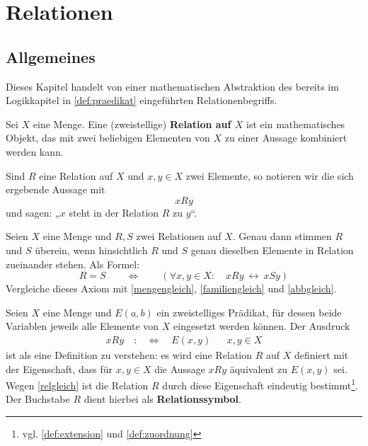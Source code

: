 



\chapter{Relationen}


\section{Allgemeines}


Dieses Kapitel handelt von einer mathematischen Abstraktion des bereits im Logikkapitel in \cref{def:praedikat} eingeführten Relationenbegriffs.


\begin{defin}[Relation] \label{def:relation} 
    Sei $X$ eine Menge. Eine (zweistellige) \textbf{Relation auf $X$} ist ein mathematisches Objekt, das mit zwei beliebigen Elementen von $X$ zu einer Aussage kombiniert werden kann.

    Sind $R$ eine Relation auf $X$ und $x,y\in X$ zwei Elemente, so notieren wir die sich ergebende Aussage mit
        \[ xRy \]
    und sagen: „$x$ steht in der Relation $R$ zu $y$“.
\end{defin}


\begin{axiom} \label{relgleich}
    Seien $X$ eine Menge und $R,S$ zwei Relationen auf $X$. Genau dann stimmen $R$ und $S$ überein, wenn hinsichtlich $R$ und $S$ genau dieselben Elemente in Relation zueinander stehen. Als Formel:
        \[ R=S \qquad\Leftrightarrow\qquad (\forall x,y\in X:\quad xRy\ \leftrightarrow\ xSy) \]
    Vergleiche dieses Axiom mit \cref{mengengleich}, \cref{familiengleich} und \cref{abbgleich}.
\end{axiom}


\begin{nota}
    Seien $X$ eine Menge und $E(a,b)$ ein zweistelliges Prädikat, für dessen beide Variablen jeweils alle Elemente von $X$ eingesetzt werden können. Der Ausdruck
    \begin{align*}
        xRy \quad :&\Leftrightarrow\quad E(x,y) && x,y\in X
    \end{align*}
    ist als eine Definition zu verstehen: es wird eine Relation $R$ auf $X$ definiert mit der Eigenschaft, dass für $x,y\in X$ die Aussage $xRy$ äquivalent zu $E(x,y)$ sei. Wegen \cref{relgleich} ist die Relation $R$ durch diese Eigenschaft eindeutig bestimmt\footnote{vgl. \cref{def:extension} und \cref{def:zuordnung}}. Der Buchstabe $R$ dient hierbei als \textbf{Relationssymbol}.
\end{nota}


